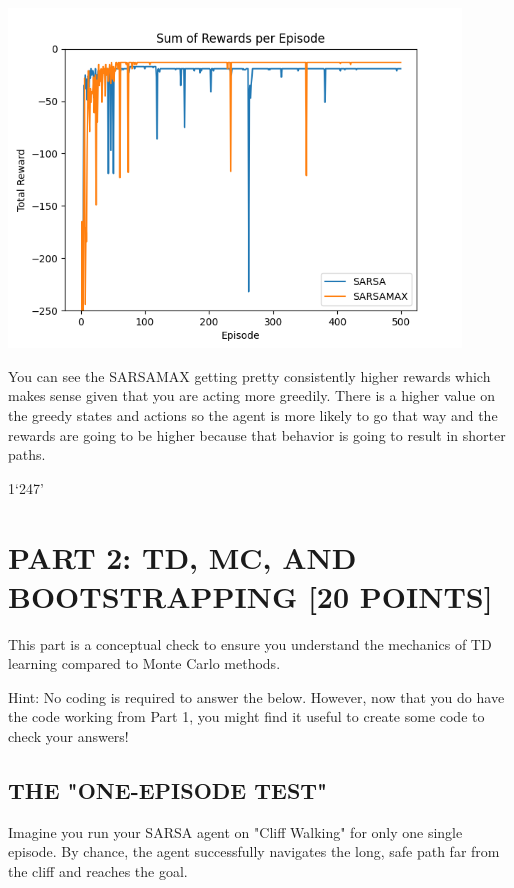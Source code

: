 \documentclass{article}
\begin{document}
\begin{itemize}
    \includegraphics[width=0.9\textwidth]{rewardsComparison.png}
    
    You can see the SARSAMAX getting pretty consistently higher rewards which makes sense given that you are acting more greedily.
    There is a higher value on the greedy states and actions so the agent is more likely to go that way and the rewards are going to be higher because that behavior is going to result in shorter paths.

1`247'\end{itemize}

\section{PART 2: TD, MC, AND BOOTSTRAPPING [20 POINTS]}

This part is a conceptual check to ensure you understand the mechanics of TD learning compared to Monte Carlo methods.

Hint: No coding is required to answer the below. However, now that you do have the code working from Part 1, you might find it useful to create some code to check your answers!

\subsection{THE "ONE-EPISODE TEST"}

Imagine you run your SARSA agent on "Cliff Walking" for only one single episode. By chance, the agent successfully navigates the long, safe path far from the cliff and reaches the goal.
\end{document}
